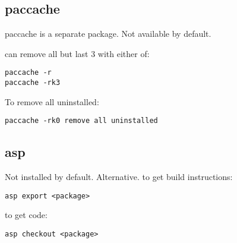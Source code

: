 \subsection{paccache}

paccache is a separate package. Not available by default.

can remove all but last 3 with either of:

\begin{verbatim}
paccache -r
paccache -rk3
\end{verbatim}

To remove all uninstalled:
\begin{verbatim}
paccache -rk0 remove all uninstalled
\end{verbatim}



\subsection{asp}

Not installed by default. Alternative.
to get build instructions:
\begin{verbatim}
asp export <package>
\end{verbatim}

to get code:

\begin{verbatim}
asp checkout <package>
\end{verbatim}

